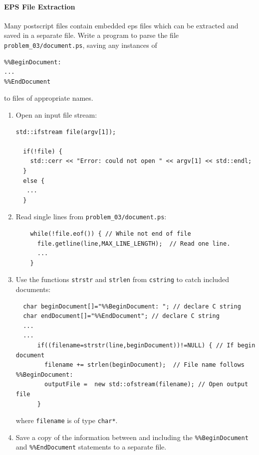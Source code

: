\documentclass[11pt,a4paper]{scrartcl}
\begin{document}
\paragraph{EPS File Extraction}
Many postscript files contain embedded eps files which can be
extracted and saved in a separate file.  Write a program to parse the
file \texttt{problem\_03/document.ps}, saving any instances of
\begin{verbatim}
%%BeginDocument: 
...
%%EndDocument
\end{verbatim}
to files of appropriate names.

\begin{enumerate}
\item Open an input file stream:
\begin{verbatim}
std::ifstream file(argv[1]);
                                                                             
  if(!file) {
    std::cerr << "Error: could not open " << argv[1] << std::endl;
  }
  else {
   ...
  }
\end{verbatim}

\item Read single lines from \texttt{problem\_03/document.ps}:
\begin{verbatim}
    while(!file.eof()) { // While not end of file
      file.getline(line,MAX_LINE_LENGTH);  // Read one line.
      ...
    }
\end{verbatim}

\item Use the functions \texttt{strstr} and \texttt{strlen} from
\texttt{cstring} to catch included documents:
\begin{verbatim}
  char beginDocument[]="%%BeginDocument: "; // declare C string
  char endDocument[]="%%EndDocument"; // declare C string
  ...
  ... 
      if((filename=strstr(line,beginDocument))!=NULL) { // If begin document
        filename += strlen(beginDocument);  // File name follows %%BeginDocument:
        outputFile =  new std::ofstream(filename); // Open output file
      }
\end{verbatim}
where \texttt{filename} is of type \texttt{char*}.

\item Save a copy of the information between and including the
\texttt{\%\%BeginDocument} and \texttt{\%\%EndDocument} statements to
a separate file.
\end{enumerate}

\end{document}

